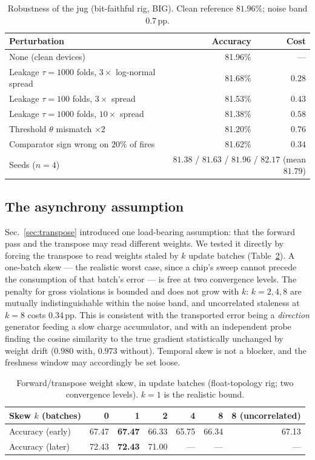 \documentclass[11pt]{article}
\begin{document}
\begin{table}[t]
\centering\small
\caption{Robustness of the jug (bit-faithful rig, BIG). Clean reference $81.96\%$; noise band
$0.7$\,pp.}
\label{tab:robust}
\begin{tabular}{@{}lrr@{}}
\toprule
Perturbation & Accuracy & Cost \\
\midrule
None (clean devices) & 81.96\% & --- \\
Leakage $\tau = 1000$ folds, $3\times$ log-normal spread & 81.68\% & $0.28$ \\
Leakage $\tau = 100$ folds, $3\times$ spread & 81.53\% & $0.43$ \\
Leakage $\tau = 1000$ folds, $10\times$ spread & 81.38\% & $0.58$ \\
Threshold $\theta$ mismatch $\times 2$ & 81.20\% & $0.76$ \\
Comparator sign wrong on $20\%$ of fires & 81.62\% & $0.34$ \\
\midrule
Seeds ($n=4$) & \multicolumn{2}{r}{$81.38$ / $81.63$ / $81.96$ / $82.17$ (mean $81.79$)} \\
\bottomrule
\end{tabular}
\end{table}

\subsection{The asynchrony assumption}

Sec.~\ref{sec:transpose} introduced one load-bearing assumption: that the forward pass and the
transpose may read different weights. We tested it directly by forcing the transpose to read weights
staled by $k$ update batches (Table~\ref{tab:skew}). A one-batch skew --- the realistic worst case,
since a chip's sweep cannot precede the consumption of that batch's error --- is free at two
convergence levels. The penalty for gross violations is bounded and does not grow with $k$: $k = 2, 4,
8$ are mutually indistinguishable within the noise band, and uncorrelated staleness at $k = 8$ costs
$0.34$\,pp. This is consistent with the transported error being a \emph{direction} generator feeding a
slow charge accumulator, and with an independent probe finding the cosine similarity to the true
gradient statistically unchanged by weight drift ($0.980$ with, $0.973$ without). Temporal skew is not
a blocker, and the freshness window may accordingly be set loose.

\begin{table}[t]
\centering\small
\caption{Forward/transpose weight skew, in update batches (float-topology rig; two convergence
levels). $k=1$ is the realistic bound.}
\label{tab:skew}
\begin{tabular}{@{}lrrrrrr@{}}
\toprule
Skew $k$ (batches) & 0 & 1 & 2 & 4 & 8 & 8 (uncorrelated) \\
\midrule
Accuracy (early) & 67.47 & \textbf{67.47} & 66.33 & 65.75 & 66.34 & 67.13 \\
Accuracy (later) & 72.43 & \textbf{72.43} & 71.00 & --- & --- & --- \\
\bottomrule
\end{tabular}
\end{table}
\end{document}
